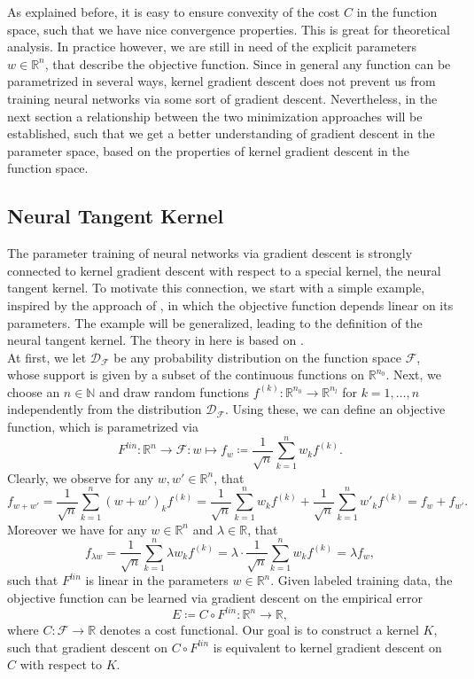 \documentclass[11pt, a4paper]{article}
\newcommand{\N}{\mathbb{N}}
\newcommand{\R}{\mathbb{R}}
\newcommand{\D}{\mathcal{D}}
\newcommand{\F}{\mathcal{F}}
\begin{document}
As explained before, it is easy to ensure convexity of the cost $C$ in the function space, such that we have nice convergence properties. This is great for theoretical analysis. In practice however, we are still in need of the explicit parameters $w \in \R^n$, that describe the objective function. Since in general any function can be parametrized in several ways, kernel gradient descent does not prevent us from training neural networks via some sort of gradient descent. Nevertheless, in the next section a relationship between the two minimization approaches will be established, such that we get a better understanding of gradient descent in the parameter space, based on the properties of kernel gradient descent in the function space.

\subsection{Neural Tangent Kernel}

The parameter training of neural networks via gradient descent is strongly connected to kernel gradient descent with respect to a special kernel, the neural tangent kernel. To motivate this connection, we start with a simple example, inspired by the approach of \cite{Features}, in which the objective function depends linear on its parameters. The example will be generalized, leading to the definition of the neural tangent kernel. The theory in here is based on \cite{NTK}. \\

At first, we let $\D_{\F}$ be any probability distribution on the function space $\F$, whose support is given by a subset of the continuous functions on $\R^{n_0}$. Next, we choose an $n \in \N$ and draw random functions $f^{(k)} : \R^{n_0} \to \R^{n_l}$ for $k=1,\dots,n$ independently from the distribution $\D_{\F}$. Using these, we can define an objective function, which is parametrized via
\[ F^\textit{lin}: \R^n \to \F : w \mapsto f_w \coloneq \frac{1}{\sqrt{n}} \sum_{k=1}^{n}w_kf^{(k)}. \]
Clearly, we observe for any $w, w' \in \R^n$, that
\[ f_{w + w'} = \frac{1}{\sqrt{n}} \sum_{k=1}^{n}(w+ w')_kf^{(k)} = \frac{1}{\sqrt{n}} \sum_{k=1}^{n}w_kf^{(k)} + \frac{1}{\sqrt{n}} \sum_{k=1}^{n}w'_kf^{(k)} = f_w + f_{w'}. \]
Moreover we have for any $w \in \R^n$ and $\lambda \in \R$, that 
\[ f_{\lambda w} = \frac{1}{\sqrt{n}} \sum_{k=1}^{n}\lambda w_kf^{(k)} = \lambda \cdot \frac{1}{\sqrt{n}} \sum_{k=1}^{n} w_kf^{(k)} = \lambda f_w, \]
such that $F^\textit{lin}$ is linear in the parameters $w \in \R^n$. Given labeled training data, the objective function can be learned via gradient descent on the empirical error
\[ E \coloneq C \circ F^\textit{lin}: \R^n \to \R, \]
where $C: \F \to \R$ denotes a cost functional. Our goal is to construct a kernel $K$, such that gradient descent on $C \circ F^\textit{lin}$ is equivalent to kernel gradient descent on $C$ with respect to $K$. \\
\end{document}

